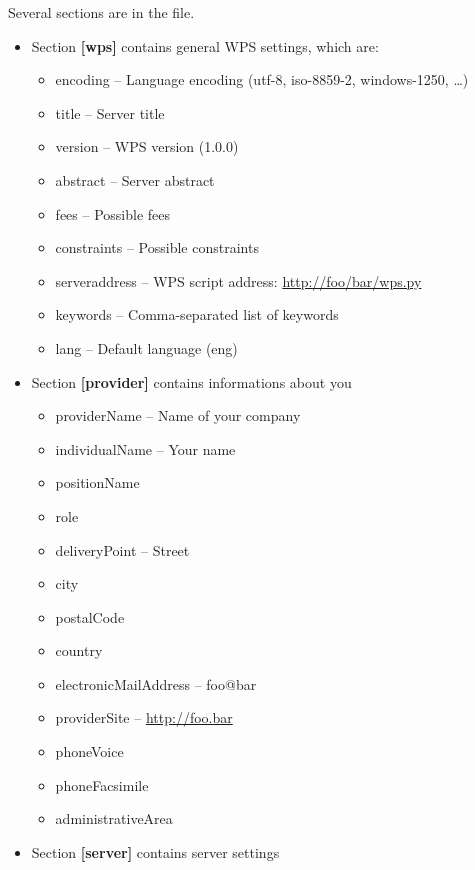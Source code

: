 \documentclass[a4paper,11pt]{report}
\begin{document}
Several sections are in the file. 
\begin{itemize}
    \item Section \textbf{[wps]} contains general WPS settings, which are:
        \begin{itemize}
            \item encoding -- Language encoding (utf-8, iso-8859-2, windows-1250, \dots)
            \item title -- Server title 
            \item version -- WPS version (1.0.0)
            \item abstract -- Server abstract
            \item fees -- Possible fees
            \item constraints -- Possible constraints
            \item serveraddress -- WPS script address: \url{http://foo/bar/wps.py}
            \item keywords -- Comma-separated list of keywords
            \item lang -- Default language (eng)
        \end{itemize}
    \item Section \textbf{[provider]} contains informations about you
        \begin{itemize}
            \item providerName -- Name of your company
            \item individualName -- Your name
            \item positionName
            \item role 
            \item deliveryPoint -- Street
            \item city
            \item postalCode
            \item country
            \item electronicMailAddress -- foo@bar
            \item providerSite -- \url{http://foo.bar}
            \item phoneVoice
            \item phoneFacsimile
            \item administrativeArea
        \end{itemize}
    \item Section \textbf{[server]} contains server settings
        \begin{itemize}

\end{itemize}
\end{itemize}
\end{document}

